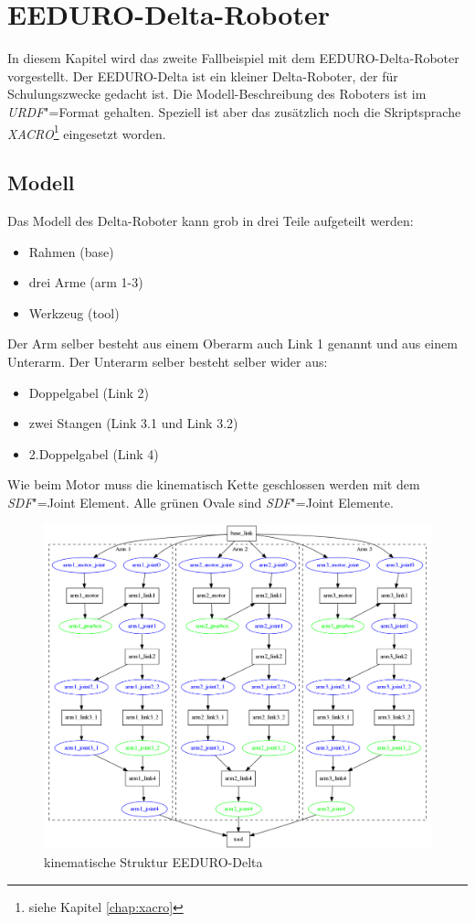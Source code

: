 \chapter{EEDURO-Delta-Roboter}


In diesem Kapitel wird das zweite Fallbeispiel mit dem EEDURO-Delta-Roboter vorgestellt.
Der EEDURO-Delta ist ein kleiner Delta-Roboter, der für Schulungszwecke gedacht ist.
Die Modell-Beschreibung des Roboters ist im \textit{URDF}"=Format gehalten.
Speziell ist aber das zusätzlich noch die Skriptsprache \textit{XACRO}\footnote{siehe Kapitel \ref{chap:xacro}} eingesetzt worden.

\section{Modell}
\label{chap:delta-modell}
Das Modell des Delta-Roboter kann grob in drei Teile aufgeteilt werden:
\begin{itemize}
\item Rahmen (base)
\item drei Arme (arm 1-3)
\item Werkzeug (tool)
\end{itemize}

Der Arm selber besteht aus einem Oberarm auch Link 1 genannt und aus einem Unterarm.
Der Unterarm selber besteht selber wider aus:
\begin{itemize}
\item Doppelgabel (Link 2)
\item zwei Stangen (Link 3.1 und Link 3.2)
\item 2.Doppelgabel (Link 4)
\end{itemize}

Wie beim Motor muss die kinematisch Kette geschlossen werden mit dem \textit{SDF}"=Joint Element.
Alle grünen Ovale sind \textit{SDF}"=Joint Elemente.

\begin{figure}[ht!]
	\centering
	\includegraphics[width=12cm]{images/delta_struktur.png}
	\caption{kinematische Struktur EEDURO-Delta}
	\label{Ab:delta-struktur}
\end{figure}


